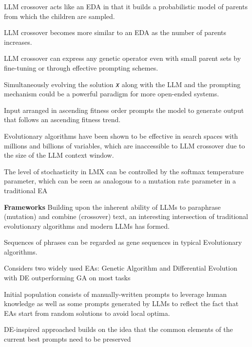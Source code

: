 LLM crossover acts like an EDA in that it builds a probabilistic model of parents from which the children are sampled. \cite{meyerson2024languagemodelcrossovervariation}

LLM crossover becomes more similar to an EDA as the number of parents increases. \cite{meyerson2024languagemodelcrossovervariation}

LLM crossover can express any genetic operator even with small parent sets by fine-tuning or through effective prompting schemes. \cite{meyerson2024languagemodelcrossovervariation}

Simultaneously evolving the solution 𝑥 along with the LLM and the prompting mechanism could be a powerful paradigm for more open-ended systems. \cite{meyerson2024languagemodelcrossovervariation}

Input arranged in ascending fitness order prompts the model to generate output that follows an ascending fitness trend. \cite{meyerson2024languagemodelcrossovervariation}

Evolutionary algorithms have been shown to be effective in search spaces with millions and billions of variables, which are inaccessible to LLM crossover due to the size of the LLM context window. \cite{meyerson2024languagemodelcrossovervariation}

The level of stochasticity in LMX can be controlled by the softmax temperature parameter, which can be seen as analogous to a mutation rate parameter in a traditional EA \cite{meyerson2024languagemodelcrossovervariation}


\textbf{Frameworks}
Building upon the inherent ability of LLMs to paraphrase (mutation) and combine (crossover) text, an interesting intersection of traditional evolutionary algorithms and modern LLMs has formed. 


Sequences of phrases can be regarded as gene sequences in typical Evolutionary algorithms. \cite{guo2024connectinglargelanguagemodels}


Considers two widely used EAs: Genetic Algorithm and Differential Evolution with DE outperforming GA on most tasks \cite{guo2024connectinglargelanguagemodels}

Initial population consists of manually-written prompts to leverage human knowledge as well as some prompts generated by LLMs to reflect the fact that EAs start from random solutions to avoid local optima. \cite{guo2024connectinglargelanguagemodels}

DE-inspired approached builds on the idea that the common elements of the current best prompts need to be preserved \cite{guo2024connectinglargelanguagemodels}

